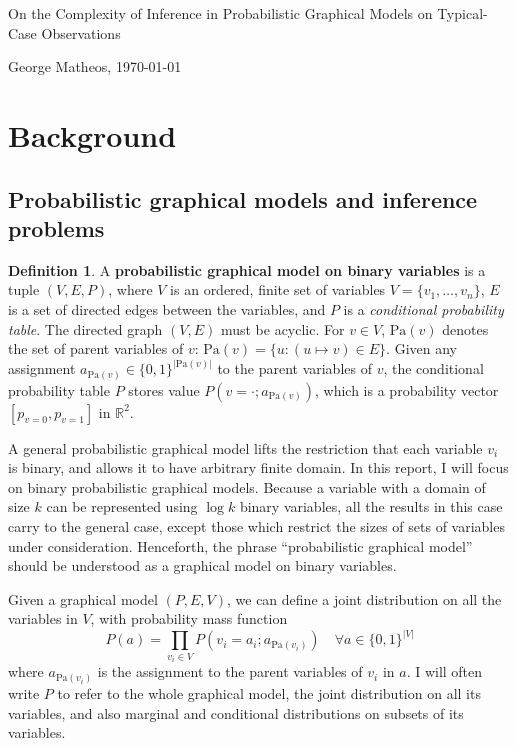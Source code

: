 \documentclass{article}
\theoremstyle{definition}
\newtheorem{defn}{Definition}
\theoremstyle{remark}
\def \Pa{\text{Pa}}
\begin{document}
\begin{center}
    \Large
    On the Complexity of Inference in Probabilistic Graphical Models on Typical-Case Observations

    \vspace{3pt}
    \normalsize
    George Matheos, \today
\end{center}

\section{Background}

\subsection{Probabilistic graphical models and inference problems}
\begin{defn}
A \textbf{probabilistic graphical model on binary variables} is a tuple $(V, E, P)$, where $V$ is an ordered, finite set of variables $V = \{v_1, \dots, v_n\}$, $E$ is a set of directed edges between the variables, and $P$ is a \textit{conditional probability table}.
The directed graph $(V, E)$ must be acyclic.
For $v \in V$, $\Pa(v)$ denotes the set of parent variables of $v$: $\Pa(v) = \{u : (u \mapsto v) \in E\}$.
Given any assignment $a_{\Pa(v)} \in \{0, 1\}^{|\Pa(v)|}$ to the parent variables of $v$, the conditional probability table $P$ stores value $P(v = \cdot ; a_{\Pa(v)})$, which is a probability vector $[p_{v=0}, p_{v=1}]$ in $\mathbb{R}^2$.
\end{defn}

A general probabilistic graphical model lifts the restriction that each variable $v_i$ is binary, and allows it to have arbitrary finite domain.
In this report, I will focus on binary probabilistic graphical models. Because a variable with a domain of size $k$ can be represented using $\log k$ binary variables, all the results in this case carry to the general case, except those which restrict the sizes of sets of variables under consideration.
Henceforth, the phrase ``probabilistic graphical model'' should be understood as a graphical model on binary variables.

Given a graphical model $(P, E, V)$, we can define a joint distribution on all the variables in $V$, with probability mass function
$$
P(a) = \prod_{v_i \in V}{P(v_i = a_i ; a_{\Pa(v_i)})} \quad \forall a \in \{0, 1\}^{|V|}
$$
where $a_{\Pa(v_i)}$ is the assignment to the parent variables of $v_i$ in $a$.
I will often write $P$ to refer to the whole graphical model, the joint distribution on all its variables, and also marginal and conditional distributions on subsets of its variables.
\end{document}
